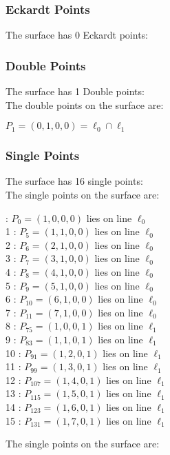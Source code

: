\documentclass{article}
\begin{document}
{\subsubsection*{Eckardt Points}
The surface has 0 Eckardt points:\\
\subsubsection*{Double Points}
The surface has 1 Double points:\\
The double points on the surface are:\\
\begin{multicols}{2}
\noindent
$P_{1} = ( 0, 1, 0, 0 ) = \ell_{0} \cap \ell_{1} $\\
\end{multicols}
\subsubsection*{Single Points}
The surface has 16 single points:\\
The single points on the surface are:\\
\begin{multicols}{2}
 : $P_{0}=( 1, 0, 0, 0 )$ lies on line $\ell_{0}$\\
1 : $P_{5}=( 1, 1, 0, 0 )$ lies on line $\ell_{0}$\\
2 : $P_{6}=( 2, 1, 0, 0 )$ lies on line $\ell_{0}$\\
3 : $P_{7}=( 3, 1, 0, 0 )$ lies on line $\ell_{0}$\\
4 : $P_{8}=( 4, 1, 0, 0 )$ lies on line $\ell_{0}$\\
5 : $P_{9}=( 5, 1, 0, 0 )$ lies on line $\ell_{0}$\\
6 : $P_{10}=( 6, 1, 0, 0 )$ lies on line $\ell_{0}$\\
7 : $P_{11}=( 7, 1, 0, 0 )$ lies on line $\ell_{0}$\\
8 : $P_{75}=( 1, 0, 0, 1 )$ lies on line $\ell_{1}$\\
9 : $P_{83}=( 1, 1, 0, 1 )$ lies on line $\ell_{1}$\\
10 : $P_{91}=( 1, 2, 0, 1 )$ lies on line $\ell_{1}$\\
11 : $P_{99}=( 1, 3, 0, 1 )$ lies on line $\ell_{1}$\\
12 : $P_{107}=( 1, 4, 0, 1 )$ lies on line $\ell_{1}$\\
13 : $P_{115}=( 1, 5, 0, 1 )$ lies on line $\ell_{1}$\\
14 : $P_{123}=( 1, 6, 0, 1 )$ lies on line $\ell_{1}$\\
15 : $P_{131}=( 1, 7, 0, 1 )$ lies on line $\ell_{1}$\\
\end{multicols}
The single points on the surface are:\\
}
\end{document}
